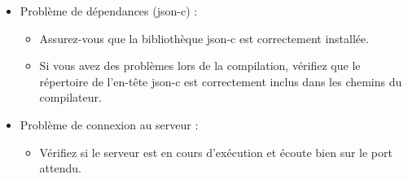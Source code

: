 \documentclass{report}
\begin{document}
\begin{itemize}
	\item Problème de dépendances (json-c) :
	\begin{itemize}
		\item Assurez-vous que la bibliothèque json-c est correctement installée.
		\item Si vous avez des problèmes lors de la compilation, vérifiez que le répertoire de l'en-tête json-c est correctement inclus dans les chemins du compilateur.
	\end{itemize}
	\item Problème de connexion au serveur :
	\begin{itemize}
		\item Vérifiez si le serveur est en cours d'exécution et écoute bien sur le port attendu.
	\end{itemize}
\end{itemize}
\end{document}
